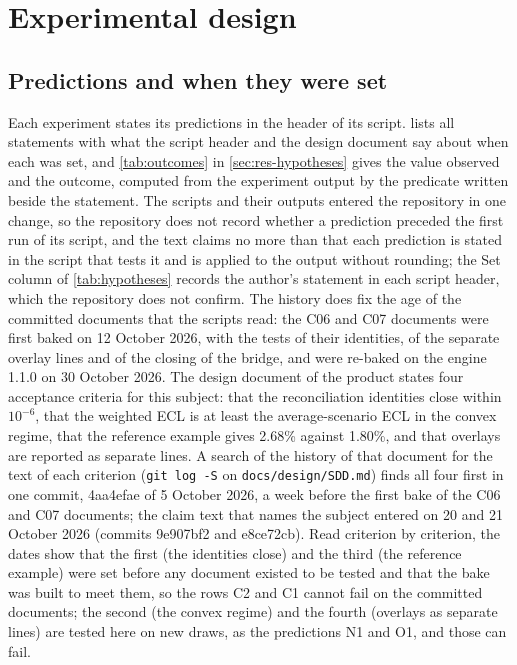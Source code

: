 \section{Experimental design}
\label{sec:experimental-design}

\subsection{Predictions and when they were set}
\label{sec:design-hypotheses}

Each experiment states its predictions in the header of its script.
 lists all \hypRows{} statements with what the script header and the design document say about when each was set, and \cref{tab:outcomes} in \cref{sec:res-hypotheses} gives the value observed and the outcome, computed from the experiment output by the predicate written beside the statement.
The scripts and their outputs entered the repository in one change, so the repository does not record whether a prediction preceded the first run of its script, and the text claims no more than that each prediction is stated in the script that tests it and is applied to the output without rounding; the Set column of \cref{tab:hypotheses} records the author's statement in each script header, which the repository does not confirm.
The history does fix the age of the committed documents that the scripts read: the C06 and C07 documents were first baked on 12 October 2026, with the tests of their identities, of the separate overlay lines and of the closing of the bridge, and were re-baked on the engine 1.1.0 on 30 October 2026.
The design document of the product states four acceptance criteria for this subject: that the reconciliation identities close within $10^{-6}$, that the weighted ECL is at least the average-scenario ECL in the convex regime, that the reference example gives 2.68\% against 1.80\%, and that overlays are reported as separate lines.
A search of the history of that document for the text of each criterion (\texttt{git log -S} on \texttt{docs/design/SDD.md}) finds all four first in one commit, 4aa4efae of 5 October 2026, a week before the first bake of the C06 and C07 documents; the claim text that names the subject entered on 20 and 21 October 2026 (commits 9e907bf2 and e8ce72cb).
Read criterion by criterion, the dates show that the first (the identities close) and the third (the reference example) were set before any document existed to be tested and that the bake was built to meet them, so the rows C2 and C1 cannot fail on the committed documents; the second (the convex regime) and the fourth (overlays as separate lines) are tested here on new draws, as the predictions N1 and O1, and those can fail.
